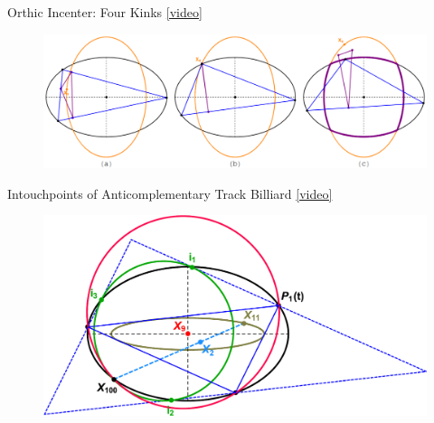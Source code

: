 \begin{frame}{Orthic Incenter: Four Kinks \href{https://youtu.be/3qJnwpFkUFQ}{[video]}}
\begin{figure}
\includegraphics[width=\textwidth]{pics/0045_ort_loci_orthic.pdf}
\end{figure}
\end{frame}

\begin{frame}{Intouchpoints of Anticomplementary Track Billiard \href{https://youtu.be/50dyxWJhfN4}{[video]}}
\begin{figure}
\includegraphics[height=.7\textheight]{pics/0048_act_intouch.pdf}
\end{figure}
\end{frame}

